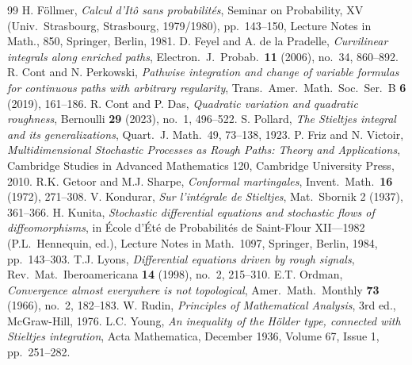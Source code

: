 \documentclass[11pt,fleqn]{article}
\theoremstyle{plain}
\theoremstyle{remark}
\begin{document}
\begin{thebibliography}{99}
H. F\"ollmer, \emph{Calcul d'It\^o sans probabilit\'es}, Seminar
on Probability, XV (Univ.\ Strasbourg, Strasbourg, 1979/1980), pp.\ 143--150,
Lecture Notes in Math., 850, Springer, Berlin, 1981.
D. Feyel and A. de la Pradelle, \emph{Curvilinear integrals
along enriched paths}, Electron.\ J.\ Probab.\ \textbf{11} (2006), no.~34,
860--892.
R. Cont and N. Perkowski, \emph{Pathwise
integration and change of variable formulas for continuous paths with
arbitrary regularity}, Trans.\ Amer.\ Math.\ Soc.\ Ser.\ B \textbf{6}
(2019), 161--186.
R. Cont and P. Das, \emph{Quadratic variation and
quadratic roughness}, Bernoulli \textbf{29} (2023), no.~1, 496--522.
S. Pollard, \emph{The Stieltjes integral and its
generalizations}, Quart.\ J. Math.\ 49, 73--138, 1923.
P. Friz and N. Victoir, \emph{Multidimensional Stochastic
Processes as Rough Paths: Theory and Applications}, Cambridge Studies in
Advanced Mathematics 120, Cambridge University Press, 2010.
R.K. Getoor and M.J. Sharpe, \emph{Conformal martingales},
Invent.\ Math.\ \textbf{16} (1972), 271--308.
V. Kondurar, \emph{Sur l'int\'egrale de Stieltjes}, Mat.\
Sbornik 2 (1937), 361--366.
H. Kunita, \emph{Stochastic differential equations and
stochastic flows of diffeomorphisms}, in \'Ecole d'\'Et\'e de Probabilit\'es
de Saint-Flour XII---1982 (P.L.\ Hennequin, ed.), Lecture Notes in Math.\
1097, Springer, Berlin, 1984, pp.\ 143--303.
\bibitem{Lyons98}T.J. Lyons, \emph{Differential equations driven by rough
signals}, Rev.\ Mat.\ Iberoamericana \textbf{14} (1998), no.~2, 215--310.
\bibitem{Ordman66}E.T. Ordman, \emph{Convergence almost everywhere is not
topological}, Amer.\ Math.\ Monthly \textbf{73} (1966), no.~2, 182--183.
\bibitem{R}W. Rudin, \emph{Principles of Mathematical Analysis}, 3rd ed.,
McGraw-Hill, 1976.
\bibitem{Y}L.C. Young, \emph{An inequality of the H\"older type, connected
with Stieltjes integration}, Acta Mathematica, December 1936, Volume 67,
Issue 1, pp.\ 251--282.
\end{thebibliography}
\end{document}
